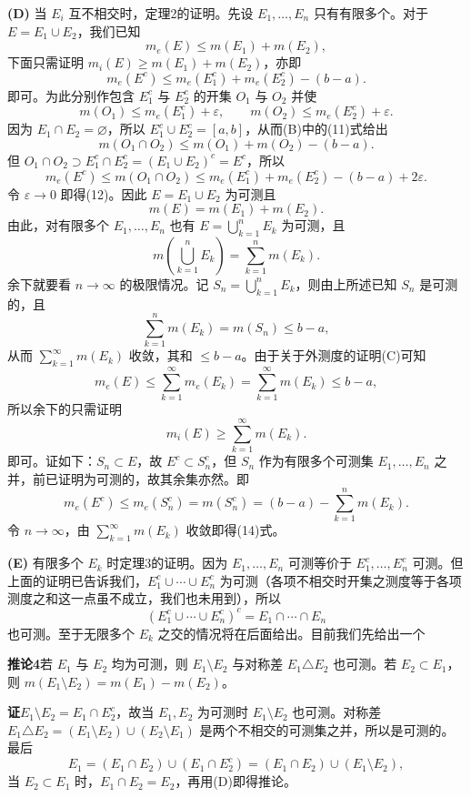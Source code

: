 \noindent\textbf{(D)} 当 $E_i$ 互不相交时，定理2的证明。先设 $E_1,\ldots,E_n$ 只有有限多个。对于 $E=E_1\cup E_2$，我们已知
\[
 m_e(E)\le m(E_1)+m(E_2),
\]
下面只需证明 $m_i(E)\ge m(E_1)+m(E_2)$，亦即
\begin{equation}
 m_e(E^c)\le m_e(E_1^c)+m_e(E_2^c)-(b-a).
 \tag{12}
\end{equation}
即可。为此分别作包含 $E_1^c$ 与 $E_2^c$ 的开集 $O_1$ 与 $O_2$ 并使
\[
 m(O_1)\le m_e(E_1^c)+\varepsilon,\qquad m(O_2)\le m_e(E_2^c)+\varepsilon.
\]
因为 $E_1\cap E_2=\varnothing$，所以 $E_1^c\cup E_2^c=[a,b]$，从而(B)中的(11)式给出
\[
 m(O_1\cap O_2)\le m(O_1)+m(O_2)-(b-a).
\]
但 $O_1\cap O_2\supset E_1^c\cap E_2^c=(E_1\cup E_2)^c=E^c$，所以
\[
 m_e(E^c)\le m(O_1\cap O_2)\le m_e(E_1^c)+m_e(E_2^c)-(b-a)+2\varepsilon.
\]
令 $\varepsilon\to0$ 即得(12)。因此 $E=E_1\cup E_2$ 为可测且
\[
 m(E)=m(E_1)+m(E_2).
\]
由此，对有限多个 $E_1,\ldots,E_n$ 也有 $E=\bigcup_{k=1}^{n}E_k$ 为可测，且
\[
 m\left(\bigcup_{k=1}^{n}E_k\right)=\sum_{k=1}^{n}m(E_k).
\]
余下就要看 $n\to\infty$ 的极限情况。记 $S_n=\bigcup_{k=1}^{n}E_k$，则由上所述已知 $S_n$ 是可测的，且
\[
 \sum_{k=1}^{n}m(E_k)=m(S_n)\le b-a,
\]
从而 $\sum_{k=1}^{\infty}m(E_k)$ 收敛，其和 $\le b-a$。由于关于外测度的证明(C)可知
\begin{equation}
 m_e(E)\le\sum_{k=1}^{\infty}m_e(E_k)=\sum_{k=1}^{\infty}m(E_k)\le b-a,
 \tag{13}
\end{equation}
所以余下的只需证明
\begin{equation}
 m_i(E)\ge\sum_{k=1}^{\infty}m(E_k).
 \tag{14}
\end{equation}
即可。证如下：$S_n\subset E$，故 $E^c\subset S_n^c$，但 $S_n$ 作为有限多个可测集 $E_1,\ldots,E_n$ 之并，前已证明为可测的，故其余集亦然。即
\[
 m_e(E^c)\le m_e(S_n^c)=m(S_n^c)=(b-a)-\sum_{k=1}^{n}m(E_k).
\]
令 $n\to\infty$，由 $\sum_{k=1}^{\infty}m(E_k)$ 收敛即得(14)式。

\noindent\textbf{(E)} 有限多个 $E_k$ 时定理3的证明。因为 $E_1,\ldots,E_n$ 可测等价于 $E_1^c,\ldots,E_n^c$ 可测。但上面的证明已告诉我们，$E_1^c\cup\cdots\cup E_n^c$ 为可测（各项不相交时开集之测度等于各项测度之和这一点虽不成立，我们也未用到），所以
\[
 (E_1^c\cup\cdots\cup E_n^c)^c=E_1\cap\cdots\cap E_n
\]
也可测。至于无限多个 $E_k$ 之交的情况将在后面给出。目前我们先给出一个

\noindent\textbf{推论4}\quad 若 $E_1$ 与 $E_2$ 均为可测，则 $E_1\setminus E_2$ 与对称差 $E_1\triangle E_2$ 也可测。若 $E_2\subset E_1$，则 $m(E_1\setminus E_2)=m(E_1)-m(E_2)$。

\noindent\textbf{证}\quad $E_1\setminus E_2=E_1\cap E_2^c$，故当 $E_1,E_2$ 为可测时 $E_1\setminus E_2$ 也可测。对称差 $E_1\triangle E_2=(E_1\setminus E_2)\cup(E_2\setminus E_1)$ 是两个不相交的可测集之并，所以是可测的。最后
\[
 E_1=(E_1\cap E_2)\cup(E_1\cap E_2^c)=(E_1\cap E_2)\cup(E_1\setminus E_2),
\]
当 $E_2\subset E_1$ 时，$E_1\cap E_2=E_2$，再用(D)即得推论。

